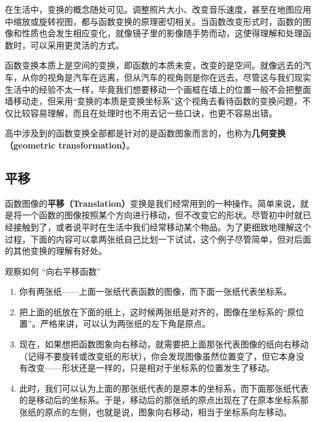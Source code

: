 

在生活中，变换的概念随处可见。调整照片大小、改变音乐速度，甚至在地图应用中缩放或旋转视图，都与函数变换的原理密切相关。当函数改变形式时，函数的图像和性质也会发生相应变化，就像镜子里的影像随手势而动，这使得理解和处理函数时，可以采用更灵活的方式。

函数变换本质上是空间的变换，即函数的本质未变，改变的是空间。就像远去的汽车，从你的视角是汽车在远离，但从汽车的视角则是你在远去。尽管这与我们现实生活中的经验不太一样，毕竟我们想要移动一个画框在墙上的位置一般不会把整面墙移动走，但采用“变换的本质是变换坐标系”这个视角去看待函数的变换问题，不仅比较容易理解，而且在处理时也不用去记一些口诀，也更不容易出错。

高中涉及到的函数变换全部都是针对的是函数图象而言的，也称为\textbf{几何变换（geometric transformation）}。

\subsection{平移}\label{sub_FunTra_1}

函数图像的\textbf{平移（Translation）}变换是我们经常用到的一种操作。简单来说，就是将一个函数的图像按照某个方向进行移动，但不改变它的形状。尽管初中时就已经接触到了，或者说平时在生活中我们经常移动某个物品。为了更细致地理解这个过程，下面的内容可以拿两张纸自己比划一下试试，这个例子尽管简单，但对后面的其他变换的理解有好处。

\begin{example}{观察如何 “向右平移函数”}
\begin{enumerate}
\item 你有两张纸——上面一张纸代表函数的图像，而下面一张纸代表坐标系。
\item 把上面的纸放在下面的纸上，这时候两张纸是对齐的，图像在坐标系的“原位置”。严格来讲，可以认为两张纸的左下角是原点。
\item 现在，如果想把函数图象向右移动，就需要把上面那张代表图像的纸向右移动（记得不要旋转或改变纸的形状），你会发现图像虽然位置变了，但它本身没有改变——形状还是一样的，只是相对于坐标系的位置发生了移动。
\item 此时，我们可以认为上面的那张纸代表的是原本的坐标系，而下面那张纸代表的是移动后的坐标系。于是，移动后的那张纸的原点出现在了在原本坐标系那张纸的原点的左侧，也就是说，图象向右移动，相当于坐标系向左移动。
\end{enumerate}
\end{example}

